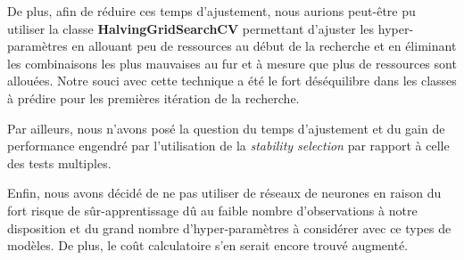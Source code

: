 \documentclass[11pt]{article}
\begin{document}
  De plus, afin de réduire ces temps d'ajustement, nous aurions peut-être pu utiliser la classe \textbf{HalvingGridSearchCV} permettant d'ajuster les hyper-paramètres en allouant peu de ressources au début de la recherche et en éliminant les combinaisons les plus mauvaises au fur et à mesure que plus de ressources sont allouées.
  Notre souci avec cette technique a été le fort déséquilibre dans les classes à prédire pour les premières itération de la recherche.

  Par ailleurs, nous n'avons posé la question du temps d'ajustement et du gain de performance engendré par l'utilisation de la \textit{stability selection} par rapport à celle des tests multiples.

  Enfin, nous avons décidé de ne pas utiliser de réseaux de neurones en raison du fort risque de sûr-apprentissage dû au faible nombre d'observations à notre disposition et du grand nombre d'hyper-paramètres à considérer avec ce types de modèles.
  De plus, le coût calculatoire s'en serait encore trouvé augmenté.
\end{document}
